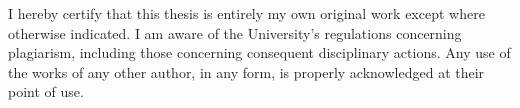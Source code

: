 \noindent
I hereby certify that this thesis is entirely my own original work except where otherwise indicated. I am aware of the University's regulations concerning plagiarism, including those concerning consequent disciplinary actions. Any use of the works of any other author, in any form, is properly acknowledged at their point of use.